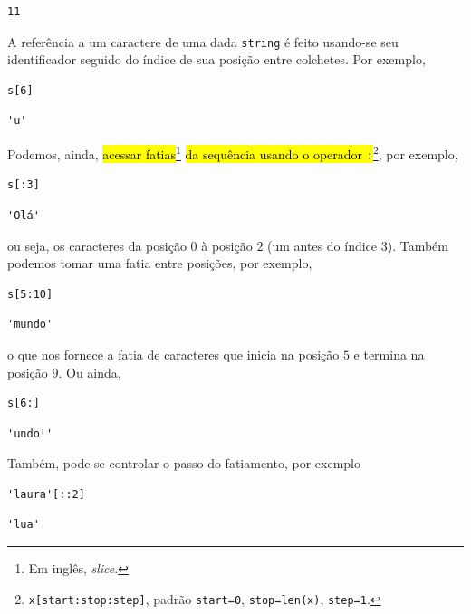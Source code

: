 \begin{verbatim}
11
\end{verbatim}

A referência a um caractere de uma dada \texttt{string} é feito usando-se seu identificador seguido do índice de sua posição entre colchetes. Por exemplo,

\begin{lstlisting}
s[6]
\end{lstlisting}

\begin{verbatim}
'u'
\end{verbatim}

Podemos, ainda, \hl{acessar fatias}\footnote{Em inglês, \textit{slice}.}\hl{ da sequência usando o operador \texttt{:}}\footnote{{\lstinline+x[start:stop:step]+}, padrão {\lstinline+start=0+}, {\lstinline+stop=len(x)+}, {\lstinline+step=1+.}}, por exemplo,

\begin{lstlisting}
s[:3]
\end{lstlisting}

\begin{verbatim}
'Olá'
\end{verbatim}

ou seja, os caracteres da posição $0$ à posição $2$ (um antes do índice $3$). Também podemos tomar uma fatia entre posições, por exemplo,

\begin{lstlisting}
s[5:10]
\end{lstlisting}

\begin{verbatim}
'mundo'
\end{verbatim}

o que nos fornece a fatia de caracteres que inicia na posição $5$ e termina na posição $9$. Ou ainda,

\begin{lstlisting}
s[6:]
\end{lstlisting}

\begin{verbatim}
'undo!'
\end{verbatim}

Também, pode-se controlar o passo do fatiamento, por exemplo

\begin{lstlisting}
'laura'[::2]
\end{lstlisting}

\begin{verbatim}
'lua'
\end{verbatim}


